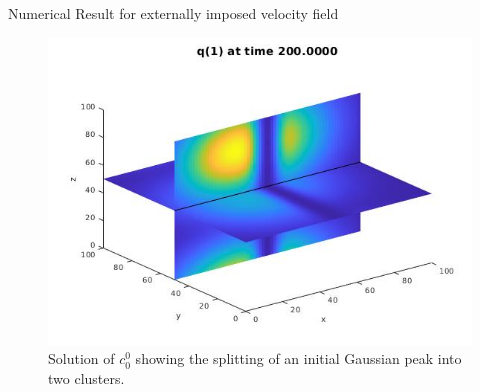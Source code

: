 \begin{frame}{Numerical Result for externally imposed velocity field}
\begin{figure}[H]
\begin{minipage}{0.32\textwidth}
    			\includegraphics[width=\linewidth]{Bilder_3D/1Glocke_wxi=wyj=1_wzk=0_2Cluster_t=200}
    		\end{minipage}
    		\caption{Solution of $c^0_0$ showing the splitting of an initial Gaussian peak into two clusters.}
    	\end{figure}
    \end{frame}


